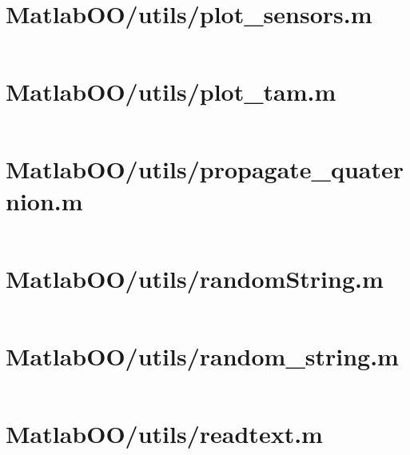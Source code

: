 \pagebreak
\section*{MatlabOO/utils/plot\_sensors.m}\label{code:MatlabOO/utils/plot_sensors.m}
\inputminted[linenos,fontsize=\scriptsize]{matlab}{/home/dcouture/git/mathyourlife/TSatPy/beta_versions/matlab_object_oriented/utils/plot_sensors.m}

\pagebreak
\section*{MatlabOO/utils/plot\_tam.m}\label{code:MatlabOO/utils/plot_tam.m}
\inputminted[linenos,fontsize=\scriptsize]{matlab}{/home/dcouture/git/mathyourlife/TSatPy/beta_versions/matlab_object_oriented/utils/plot_tam.m}

\pagebreak
\section*{MatlabOO/utils/propagate\_quaternion.m}\label{code:MatlabOO/utils/propagate_quaternion.m}
\inputminted[linenos,fontsize=\scriptsize]{matlab}{/home/dcouture/git/mathyourlife/TSatPy/beta_versions/matlab_object_oriented/utils/propagate_quaternion.m}

\pagebreak
\section*{MatlabOO/utils/randomString.m}\label{code:MatlabOO/utils/randomString.m}
\inputminted[linenos,fontsize=\scriptsize]{matlab}{/home/dcouture/git/mathyourlife/TSatPy/beta_versions/matlab_object_oriented/utils/randomString.m}

\pagebreak
\section*{MatlabOO/utils/random\_string.m}\label{code:MatlabOO/utils/random_string.m}
\inputminted[linenos,fontsize=\scriptsize]{matlab}{/home/dcouture/git/mathyourlife/TSatPy/beta_versions/matlab_object_oriented/utils/random_string.m}

\pagebreak
\section*{MatlabOO/utils/readtext.m}\label{code:MatlabOO/utils/readtext.m}
\inputminted[linenos,fontsize=\scriptsize]{matlab}{/home/dcouture/git/mathyourlife/TSatPy/beta_versions/matlab_object_oriented/utils/readtext.m}

